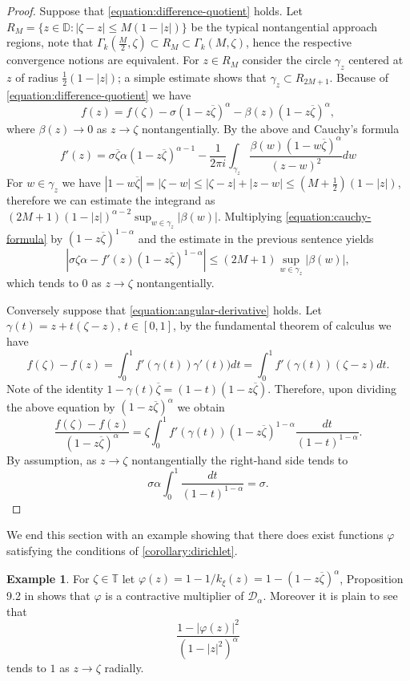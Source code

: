 \documentclass[leqno, final]{article}
\theoremstyle{definition}
\newtheorem{example}{Example}
\newcommand{\disk}{\mathbb{D}}
\newcommand{\dirichlet}{\mathcal{D}}
\newcommand{\torus}{\mathbb{T}}
\renewcommand{\phi}{\varphi}
\begin{document}
\begin{proof}
Suppose that \eqref{equation:difference-quotient} holds.
Let $R_M = \{z\in\disk:|\zeta-z|\leq M(1-|z|)\}$ be the typical nontangential approach regions,
note that $\Gamma_k(\frac M2,\zeta)\subset R_M\subset\Gamma_k(M,\zeta)$, hence the respective
convergence notions are equivalent.
For $z\in R_M$ consider the circle $\gamma_z$ centered at $z$ of radius $\frac12(1-|z|)$;
a simple estimate shows that $\gamma_z\subset R_{2M+1}$. Because of
\eqref{equation:difference-quotient} we have \[
	f(z)
	= f(\zeta) - \sigma(1-z\overline\zeta)^\alpha - \beta(z)(1-z\overline\zeta)^\alpha,
\]
where $\beta(z)\to0$ as $z\to\zeta$ nontangentially. By the above and Cauchy's formula
\begin{equation}\label{equation:cauchy-formula}
	f'(z)
	= \sigma\overline\zeta\alpha(1-z\overline\zeta)^{\alpha-1}
		-\frac1{2\pi i}\int_{\gamma_z}\frac{\beta(w)(1-w\overline\zeta)^\alpha}{(z-w)^2}dw
\end{equation}
For $w\in\gamma_z$ we have
$|1-w\overline\zeta| = |\zeta - w| \leq |\zeta - z| + |z - w| \leq (M+\frac12)(1-|z|)$,
therefore we can estimate the integrand as $(2M+1)(1-|z|)^{\alpha-2}\sup_{w\in\gamma_z}|\beta(w)|$.
Multiplying \eqref{equation:cauchy-formula} by $(1-z\overline\zeta)^{1-\alpha}$ and the estimate
in the previous sentence yields \[
	|\sigma\zeta\alpha - f'(z)(1-z\overline\zeta)^{1-\alpha}|
	\leq (2M+1)\sup_{w\in\gamma_z}|\beta(w)|,
\]
which tends to $0$ as $z\to\zeta$ nontangentially.

Conversely suppose that \eqref{equation:angular-derivative} holds.
Let $\gamma(t) = z + t(\zeta - z),\,t\in[0,1]$, by the fundamental theorem of calculus we have \[
	f(\zeta)-f(z)
	= \int_0^1f'(\gamma(t))\gamma'(t))dt
	= \int_0^1f'(\gamma(t))(\zeta-z)dt.
\]
Note of the identity $1-\gamma(t)\overline\zeta = (1-t)(1-z\overline\zeta)$. Therefore,
upon dividing the above equation by $(1-z\overline\zeta)^\alpha$ we obtain \[
	\frac{f(\zeta)-f(z)}{(1-z\overline\zeta)^\alpha}
	= \zeta\int_0^1f'(\gamma(t))(1-z\overline\zeta)^{1-\alpha}\frac{dt}{(1-t)^{1-\alpha}}.
\]
By assumption, as $z\to\zeta$ nontangentially the right-hand side tends to \[
	\sigma\alpha\int_0^1\frac{dt}{(1-t)^{1-\alpha}} = \sigma.
\]
\end{proof}

We end this section with an example showing that there does exist functions $\phi$ satisfying
the conditions of \cref{corollary:dirichlet}.
\begin{example}\label{example:hartz}
For $\zeta\in\torus$ let $\phi(z) = 1 - 1/k_\xi(z) = 1 - (1-z\overline\zeta)^\alpha$,
Proposition 9.2 in \cite{davidson-hartz_ball} shows that $\phi$ is a contractive
multiplier of $\dirichlet_\alpha$. Moreover it is plain to see that \[
	\frac{1-|\phi(z)|^2}{(1-|z|^2)^\alpha}
\]
tends to $1$ as $z\to\zeta$ radially.
\end{example}
\end{document}
